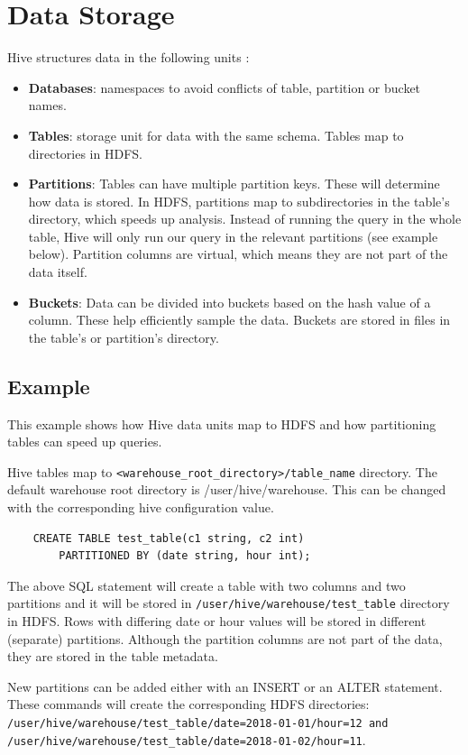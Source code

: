 \section{Data Storage}
Hive structures data in the following units  \cite{Hive-paper, Hive-apache}:
\begin{itemize}
\item \textbf{Databases}: namespaces to avoid conflicts of table, partition or bucket names.
\item \textbf{Tables}: storage unit for data with the same schema. Tables map to directories in HDFS.
\item \textbf{Partitions}: Tables can have multiple partition keys. These will determine how data is stored. In HDFS, partitions map to subdirectories in the table's directory, which speeds up analysis. Instead of running the query in the whole table, Hive will only run our query in the relevant partitions (see example below). Partition columns are virtual, which means they are not part of the data itself.
\item \textbf{Buckets}: Data can be divided into buckets based on the hash value of a column. These help efficiently sample the data. Buckets are stored in files in the table's or partition's directory.
\end{itemize}

\subsection{Example}
This example shows how Hive data units map to HDFS and how partitioning tables can speed up queries.

Hive tables map to \texttt{<warehouse\_root\_directory>/table\_name} directory. The default warehouse root directory is /user/hive/warehouse. This can be changed with the corresponding hive configuration value.
\begin{lstlisting}
	CREATE TABLE test_table(c1 string, c2 int) 
		PARTITIONED BY (date string, hour int);
\end{lstlisting}

The above SQL statement will create a table with two columns and two partitions and it will be stored in  \texttt{/user/hive/warehouse/test\_table} directory in HDFS. Rows with differing date or hour values will be stored in different (separate) partitions. Although the partition columns are not part of the data, they are stored in the table metadata. 

New partitions can be added either with an INSERT or an ALTER statement. These commands will create the corresponding HDFS directories: 
\texttt{/user/hive/warehouse/test\_table/date=2018-01-01/hour=12 and /user/hive/warehouse/test\_table/date=2018-01-02/hour=11}.

